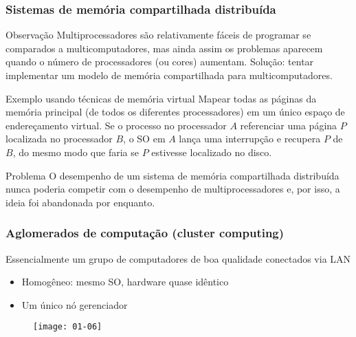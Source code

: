 \documentclass[Ligatures=TeX,table,brazil,svgnames,usetotalslideindicator,compress,10pt]{beamer}
\begin{document}
\begin{frame}
  \frametitle{Sistemas de memória  compartilhada distribuída}
  \small
  \begin{block}{Observação}
    Multiprocessadores são relativamente fáceis de programar se comparados a multicomputadores, mas ainda assim os problemas aparecem quando o número de processadores (ou cores) aumentam. Solução: tentar implementar um modelo de memória compartilhada para multicomputadores.
  \end{block}

  \begin{exampleblock}{Exemplo usando técnicas de memória virtual}
    Mapear todas as páginas da memória principal (de todos os diferentes processadores) em um único espaço de endereçamento virtual. Se o processo no processador $A$ referenciar uma página $P$ localizada no processador $B$, o SO em $A$ lança uma interrupção e recupera $P$ de $B$, do mesmo modo que faria se $P$ estivesse localizado no disco.
\end{exampleblock}

\begin{block}{Problema}
  O desempenho de um sistema de memória compartilhada distribuída nunca poderia competir com o desempenho de multiprocessadores e, por isso, a ideia foi abandonada por enquanto.
\end{block}

\end{frame}

\begin{frame}
  \frametitle{Aglomerados de computação (cluster computing)}
  \begin{block}{Essencialmente um grupo de computadores de boa qualidade conectados via LAN}

    \begin{itemize}
    \item Homogêneo: mesmo SO, hardware quase idêntico
    \item Um único nó gerenciador
    \end{itemize}
  \end{block}

  \begin{figure}
    \centering
    \texttt{[image: 01-06]}
  \end{figure}
\end{frame}
\end{document}
